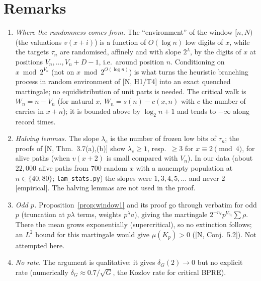 \documentclass[11pt]{amsart}
\theoremstyle{definition}
\begin{document}
\section{Remarks}
\begin{enumerate}
\item \emph{Where the randomness comes from.} The ``environment'' of the window $[n,N)$ (the valuations $v(x+i)$) is a function of
$O(\log n)$ low digits of $x$, while the targets $\tau_n$ are randomised, affinely and with slope $2^{\lambda}$, by the digits of $x$
at positions $V_n,\dots,V_n+D-1$, i.e.\ around position $n$. Conditioning on $x\bmod2^{V_n}$ (not on $x\bmod 2^{O(\log n)}$) is what turns the
heuristic branching process in random environment of [N, H1/T4] into an exact quenched martingale; no equidistribution of unit parts is needed.
The critical walk is $W_n=n-V_n$ (for natural $x$, $W_n=s(n)-c(x,n)$ with $c$ the number of carries in $x+n$); it is bounded above by $\log_2 n+1$ and tends to $-\infty$ along record times.
\item \emph{Halving lemmas.} The slope $\lambda_e$ is the number of frozen low bits of $\tau_n$; the proofs of [N, Thm.~3.7(a),(b)] show
$\lambda_e\ge1$, resp.\ $\ge3$ for $x\equiv2\pmod4$, for alive paths (when $v(x+2)$ is small compared with $V_n$). In our data
(about $22{,}000$ alive paths from $700$ random $x$ with a nonempty population at $n\in\{40,80\}$; \texttt{lam\_stats.py}) the slopes were $1,3,4,5,\dots$ and never $2$ [empirical]. The halving lemmas are not used in the proof.
\item \emph{Odd $p$.} Proposition~\ref{prop:window1} and its proof go through verbatim for odd $p$ (truncation at $p\lambda$ terms, weights
$p^\lambda a$), giving the martingale $2^{-n_\ell}p^{V_{n_\ell}}\sum\rho$. There the mean grows exponentially (supercritical), so no
extinction follows; an $L^2$ bound for this martingale would give $\mu(K_p)>0$ ([N, Conj.~5.2]). Not attempted here.
\item \emph{No rate.} The argument is qualitative: it gives $\delta_G(2)\to0$ but no explicit rate (numerically $\delta_G\approx0.7/\sqrt G$, the
Kozlov rate for critical BPRE).
\end{enumerate}
\end{document}
